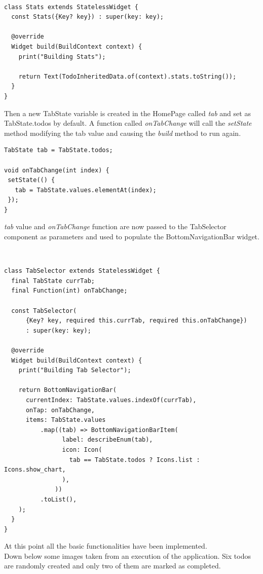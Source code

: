 \mbox{}\\


\begin{verbatim}
class Stats extends StatelessWidget {
  const Stats({Key? key}) : super(key: key);

  @override
  Widget build(BuildContext context) {
    print("Building Stats");

    return Text(TodoInheritedData.of(context).stats.toString());
  }
}
\end{verbatim}

Then a new TabState variable is created in the HomePage called \textit{tab} and set as TabState.todos by default. A function called \textit{onTabChange} will call the \textit{setState} method modifying the tab value and causing the \textit{build} method to run again. 
\mbox{}\\


\begin{verbatim}
TabState tab = TabState.todos;

void onTabChange(int index) {
 setState(() {
   tab = TabState.values.elementAt(index);
 });
}
\end{verbatim}

\textit{tab} value and \textit{onTabChange} function are now passed to the TabSelector component as parameters and used to populate the BottomNavigationBar widget.

\mbox{}\\


\begin{verbatim}
class TabSelector extends StatelessWidget {
  final TabState currTab;
  final Function(int) onTabChange;

  const TabSelector(
      {Key? key, required this.currTab, required this.onTabChange})
      : super(key: key);

  @override
  Widget build(BuildContext context) {
    print("Building Tab Selector");

    return BottomNavigationBar(
      currentIndex: TabState.values.indexOf(currTab),
      onTap: onTabChange,
      items: TabState.values
          .map((tab) => BottomNavigationBarItem(
                label: describeEnum(tab),
                icon: Icon(
                  tab == TabState.todos ? Icons.list : Icons.show_chart,
                ),
              ))
          .toList(),
    );
  }
}

\end{verbatim}

 
At this point all the basic functionalities have been implemented. \\
Down below some images taken from an execution of the application. Six todos are randomly created and only two of them are marked as completed.


